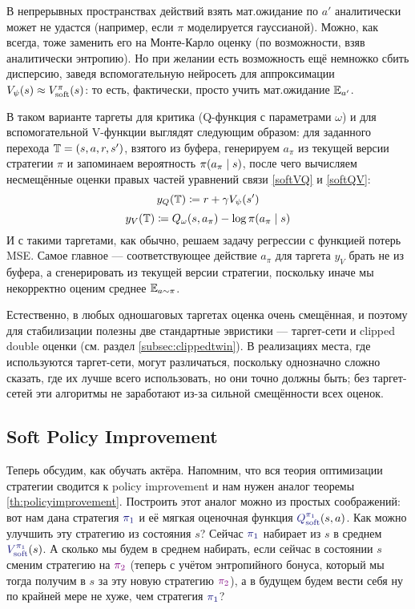 В непрерывных пространствах действий взять мат.ожидание по $a'$ аналитически может не удастся (например, если $\pi$ моделируется гауссианой). Можно, как всегда, тоже заменить его на Монте-Карло оценку (по возможности, взяв аналитически энтропию). Но при желании есть возможность ещё немножко сбить дисперсию, заведя вспомогательную нейросеть для аппроксимации $V_\psi(s) \HM \approx V^\pi_{\soft}(s)$: то есть, фактически, просто учить мат.ожидание $\mathbb{E}_{a'}$.

В таком варианте таргеты для критика (Q-функция с параметрами $\omega$) и для вспомогательной V-функции выглядят следующим образом: для заданного перехода $\T \HM= (s, a, r, s')$, взятого из буфера, генерируем $a_\pi$ из текущей версии стратегии $\pi$ и запоминаем вероятность $\pi(a_\pi \HM\mid s)$, после чего вычисляем несмещённые оценки правых частей уравнений связи \eqref{softVQ} и \eqref{softQV}:
$$y_Q(\mathbb{T}) \coloneqq r + \gamma V_\psi(s')$$
$$y_V(\mathbb{T}) \coloneqq Q_\omega(s, a_\pi) - \log \pi(a_\pi \mid s)$$
И с такими таргетами, как обычно, решаем задачу регрессии с функцией потерь MSE. Самое главное --- соответствующее действие $a_\pi$ для таргета $y_V$ брать не из буфера, а сгенерировать из текущей версии стратегии, поскольку иначе мы некорректно оценим среднее $\mathbb{E}_{a \sim \pi}$.

Естественно, в любых одношаговых таргетах оценка очень смещённая, и поэтому для стабилизации полезны две стандартные эвристики --- таргет-сети и clipped double оценки (см. раздел \ref{subsec:clippedtwin}). В реализациях места, где используются таргет-сети, могут различаться, поскольку однозначно сложно сказать, где их лучше всего использовать, но они точно должны быть; без таргет-сетей эти алгоритмы не заработают из-за сильной смещённости всех оценок.

\subsection{Soft Policy Improvement}

Теперь обсудим, как обучать актёра. Напомним, что вся теория оптимизации стратегии сводится к policy improvement и нам нужен аналог теоремы \ref{th:policyimprovement}. Построить этот аналог можно из простых соображений: вот нам дана стратегия $\textcolor{ChadBlue}{\pi_1}$ и её мягкая оценочная функция $\textcolor{ChadBlue}{Q^{\pi_1}_{\soft}}(s, a)$. Как можно улучшить эту стратегию из состояния $s$? Сейчас $\textcolor{ChadBlue}{\pi_1}$ набирает из $s$ в среднем $\textcolor{ChadBlue}{V^{\pi_1}_{\soft}}(s)$. А сколько мы будем в среднем набирать, если сейчас в состоянии $s$ сменим стратегию на $\textcolor{ChadPurple}{\pi_2}$ (теперь с учётом энтропийного бонуса, который мы тогда получим в $s$ за эту новую стратегию $\textcolor{ChadPurple}{\pi_2}$), а в будущем будем вести себя ну по крайней мере не хуже, чем стратегия $\textcolor{ChadBlue}{\pi_1}$?

